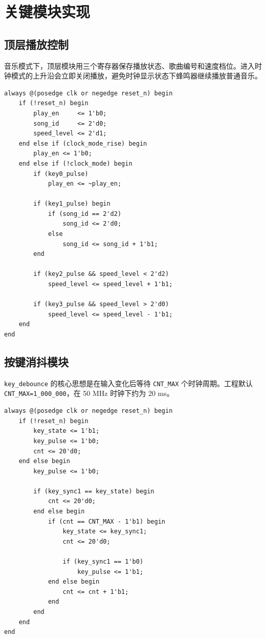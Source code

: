 \documentclass[UTF8,a4paper,12pt]{ctexart}
\begin{document}
\section{关键模块实现}

\subsection{顶层播放控制}

音乐模式下，顶层模块用三个寄存器保存播放状态、歌曲编号和速度档位。进入时钟模式的上升沿会立即关闭播放，避免时钟显示状态下蜂鸣器继续播放普通音乐。

\begin{lstlisting}[style=svstyle,caption={音乐播放状态控制}]
always @(posedge clk or negedge reset_n) begin
    if (!reset_n) begin
        play_en     <= 1'b0;
        song_id     <= 2'd0;
        speed_level <= 2'd1;
    end else if (clock_mode_rise) begin
        play_en <= 1'b0;
    end else if (!clock_mode) begin
        if (key0_pulse)
            play_en <= ~play_en;

        if (key1_pulse) begin
            if (song_id == 2'd2)
                song_id <= 2'd0;
            else
                song_id <= song_id + 1'b1;
        end

        if (key2_pulse && speed_level < 2'd2)
            speed_level <= speed_level + 1'b1;

        if (key3_pulse && speed_level > 2'd0)
            speed_level <= speed_level - 1'b1;
    end
end
\end{lstlisting}

\subsection{按键消抖模块}

\verb|key_debounce| 的核心思想是在输入变化后等待 \verb|CNT_MAX| 个时钟周期。工程默认 \verb|CNT_MAX=1_000_000|，在 50 MHz 时钟下约为 20 ms。

\begin{lstlisting}[style=svstyle,caption={按键消抖核心逻辑}]
always @(posedge clk or negedge reset_n) begin
    if (!reset_n) begin
        key_state <= 1'b1;
        key_pulse <= 1'b0;
        cnt <= 20'd0;
    end else begin
        key_pulse <= 1'b0;

        if (key_sync1 == key_state) begin
            cnt <= 20'd0;
        end else begin
            if (cnt == CNT_MAX - 1'b1) begin
                key_state <= key_sync1;
                cnt <= 20'd0;

                if (key_sync1 == 1'b0)
                    key_pulse <= 1'b1;
            end else begin
                cnt <= cnt + 1'b1;
            end
        end
    end
end
\end{lstlisting}
\end{document}
